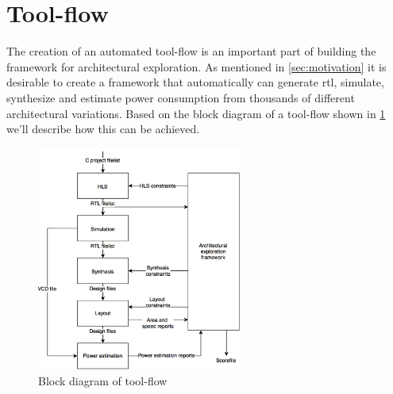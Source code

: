 \section{Tool-flow}
The creation of an automated tool-flow is an important part of building the framework for architectural exploration.  As mentioned in \cref{sec:motivation} it is desirable to create a framework that automatically can generate \gls{rtl}, simulate, synthesize and estimate power consumption from thousands of different architectural variations. Based on the block diagram of a tool-flow shown in \cref{fig:toolflowblock} we'll describe how this can be achieved. 
\begin{figure}[hbpt]
\centering
\includegraphics[width=0.6\textwidth]{../figs/Toolflow.png}
\caption{\label{fig:toolflowblock}Block diagram of tool-flow}
\end{figure}
